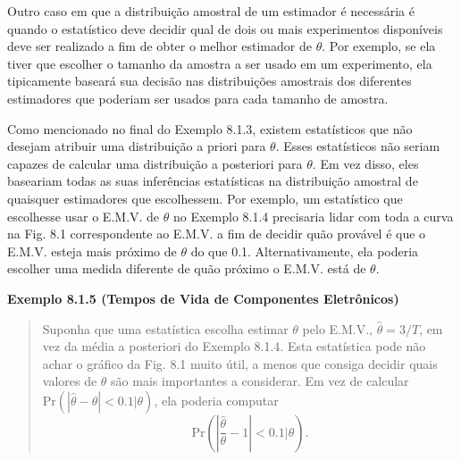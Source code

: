 Outro caso em que a distribuição amostral de um estimador é necessária é quando o estatístico deve decidir qual de dois ou mais experimentos disponíveis deve ser realizado a fim de obter o melhor estimador de $\theta$. Por exemplo, se ela tiver que escolher o tamanho da amostra a ser usado em um experimento, ela tipicamente baseará sua decisão nas distribuições amostrais dos diferentes estimadores que poderiam ser usados para cada tamanho de amostra.

Como mencionado no final do Exemplo 8.1.3, existem estatísticos que não desejam atribuir uma distribuição a priori para $\theta$. Esses estatísticos não seriam capazes de calcular uma distribuição a posteriori para $\theta$. Em vez disso, eles baseariam todas as suas inferências estatísticas na distribuição amostral de quaisquer estimadores que escolhessem. Por exemplo, um estatístico que escolhesse usar o E.M.V. de $\theta$ no Exemplo 8.1.4 precisaria lidar com toda a curva na Fig. 8.1 correspondente ao E.M.V. a fim de decidir quão provável é que o E.M.V. esteja mais próximo de $\theta$ do que 0.1. Alternativamente, ela poderia escolher uma medida diferente de quão próximo o E.M.V. está de $\theta$.

\vspace{1em}
\noindent\textbf{Exemplo 8.1.5 (Tempos de Vida de Componentes Eletrônicos)}
\begin{quote}
    Suponha que uma estatística escolha estimar $\theta$ pelo E.M.V., $\hat{\theta} = 3/T$, em vez da média a posteriori do Exemplo 8.1.4. Esta estatística pode não achar o gráfico da Fig. 8.1 muito útil, a menos que consiga decidir quais valores de $\theta$ são mais importantes a considerar. Em vez de calcular $\text{Pr}(|\hat{\theta} - \theta| < 0.1|\theta)$, ela poderia computar
    \begin{equation} \label{eq:8.1.2}
        \text{Pr}\left(\left|\frac{\hat{\theta}}{\theta} - 1\right| < 0.1 \bigg| \theta\right).
    \end{equation}
\end{quote}
\vspace{1em}

